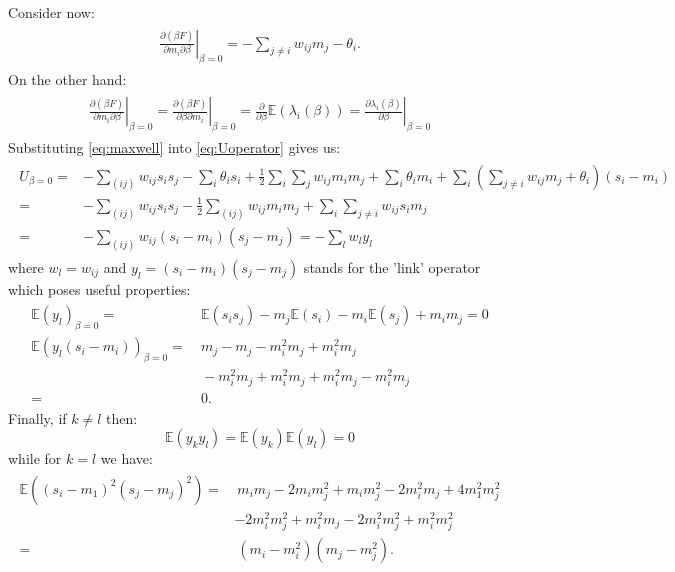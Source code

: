 \documentclass[../report/report.tex]{subfiles}
\begin{document}
Consider now:
\begin{align}
\begin{split}
\left.\frac{\partial (\beta F)}{\partial m_i \partial \beta}\right|_{\beta = 0} = 
- \sum_{j \neq i} w_{ij} m_j - \theta_i.
\end{split}
\end{align}
On the other hand:
\begin{align}
\begin{split}
\left. \frac{\partial (\beta F)}{\partial m_i \partial \beta}\right|_{\beta = 0} = \left. \frac{\partial (\beta F)}{\partial \beta \partial m_i }\right|_{\beta = 0} = \frac{\partial}{\partial \beta} \mathbb{E} (\lambda_i(\beta)) =  \left. \frac{\partial \lambda_i (\beta)}{\partial \beta}\right|_{\beta =0}
 \label{eq:maxwell}
 \end{split}
\end{align}
Substituting  \ref{eq:maxwell} into \ref{eq:Uoperator} gives us:
\begin{align}
\begin{split}
U_{\beta = 0} = & -\sum_{(ij)} w_{ij}s_is_j -\sum_i \theta_i s_i + \frac{1}{2} \sum_i \sum_j w_{ij} m_i m_j + \sum_i \theta_i m_i + \sum_i \left(\sum_{j \neq i} w_{ij} m_j  + \theta_i \right)(s_i - m_i ) \\
= & -\sum_{(ij)} w_{ij}s_i s_j - \frac{1}{2}\sum_{(ij)} w_{ij} m_i m_j + \sum_i \sum_{j \neq i} w_{ij} s_i m_j \\
= & - \sum_{(ij)} w_{ij} (s_i - m_i)(s_j- m_j) = - \sum_l w_l y_l
 \end{split}
\end{align}
where $w_l = w_{ij}$ and $y_l = (s_i -m_i)(s_j-m_j)$ stands for the 'link' operator which poses useful properties:
\begin{align}
\begin{split}
\mathbb{E}(y_l)_{\beta =0} = & ~\mathbb{E}(s_i s_j) -m_j\mathbb{E}(s_i) - m_i\mathbb{E}(s_j) + m_i m_j = 0 \\
\mathbb{E}(y_l(s_i-m_i))_{\beta =0} = & ~ m_j - m_j -m_i^2m_j + m_i^2m_j \\
 & ~ - m_i^2m_j + m_i^2m_j + m_i^2m_j - m_i^2m_j \\
 = &~ 0.
 \end{split}
\end{align}
Finally, if $k \neq l$ then:
$$\mathbb{E}(y_k y_l)= \mathbb{E}(y_k)\mathbb{E}(y_l)=0$$
while for $k = l$ we have:
\begin{align}
\begin{split}
\mathbb{E}((s_i-m_1)^2(s_j-m_j)^2)= & ~m_im_j - 2m_im_j^2 +m_im_j^2 - 2m_i^2m_j + 4m_1^2m_j^2\\
& - 2m_i^2m_j^2 + m_i^2m_j -2m_i^2m_j^2 + m_i^2m_j^2 \\
= & ~ (m_i -m_i^2)(m_j-m_j^2).
\label{eq:Yoperator}
 \end{split}
\end{align}
\end{document}
